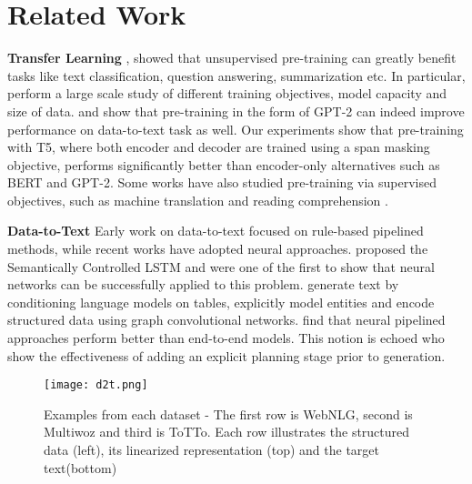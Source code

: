 \documentclass[11pt,a4paper]{article}
\begin{document}
\section{Related Work}
\textbf{Transfer Learning} \citet{devlin2018bert}, \citet{howard2018universal} showed that unsupervised pre-training can greatly benefit tasks like text classification, question answering, summarization etc. In particular, \citet{raffel2019exploring} perform a large scale study of different training objectives, model capacity and size of data. \citet{peng2020few} and \citet{chen2019few} show that pre-training in the form of GPT-2 can indeed improve performance on data-to-text task as well. Our experiments show that pre-training with T5, where both encoder and decoder are trained using a span masking objective, performs significantly better than encoder-only alternatives such as BERT and GPT-2. Some works have also studied pre-training via supervised objectives, such as machine translation \citet{siddhant2019evaluating, kale2020machine} and reading comprehension \cite{khashabi2020unifiedqa}.
\par \textbf{Data-to-Text} Early work on data-to-text focused on rule-based pipelined methods, while recent works have adopted neural approaches.  \citet{wen2015semantically} proposed the Semantically Controlled LSTM and were one of the first to show that neural networks can be successfully applied to this problem. \citet{liu2018table} generate text by conditioning language models on tables,  \citet{puduppully2019data} explicitly model entities and \citet{marcheggiani2018deep} encode structured data using graph convolutional networks. \citet{ferreira2019neural} find that neural pipelined approaches perform better than end-to-end models. This notion is echoed \citet{moryossef2019step} who show the effectiveness of adding an explicit planning stage prior to generation.

\begin{figure*}[h]
    \centering
    \texttt{[image: d2t.png]}
    \caption{Examples from each dataset - The first row is WebNLG, second is Multiwoz and third is ToTTo. Each row illustrates the structured data (left), its linearized representation (top) and the target text(bottom)}
    \label{fig:d2t-examples}
\end{figure*}
\end{document}
